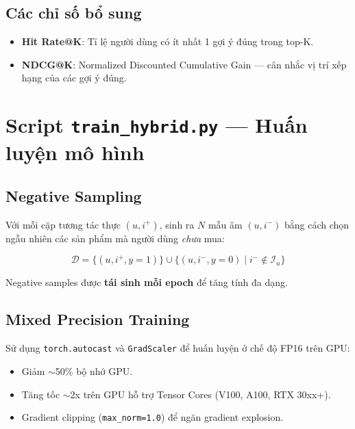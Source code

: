 \documentclass[12pt,a4paper]{article}
\begin{document}
\subsection{Các chỉ số bổ sung}

\begin{itemize}[leftmargin=2em]
    \item \textbf{Hit Rate@K}: Tỉ lệ người dùng có ít nhất 1 gợi ý đúng trong top-K.
    \item \textbf{NDCG@K}: Normalized Discounted Cumulative Gain —
          cân nhắc vị trí xếp hạng của các gợi ý đúng.
\end{itemize}

\section{Script \texttt{train\_hybrid.py} — Huấn luyện mô hình}

\subsection{Negative Sampling}

Với mỗi cặp tương tác thực $(u, i^+)$, sinh ra $N$ mẫu âm $(u, i^-)$
bằng cách chọn ngẫu nhiên các sản phẩm mà người dùng \textit{chưa} mua:

\begin{equation}
    \mathcal{D} = \{(u, i^+, y=1)\} \cup \{(u, i^-, y=0) \mid i^- \notin \mathcal{I}_u\}
\end{equation}

Negative samples được \textbf{tái sinh mỗi epoch} để tăng tính đa dạng.

\subsection{Mixed Precision Training}

Sử dụng \texttt{torch.autocast} và \texttt{GradScaler} để huấn luyện
ở chế độ FP16 trên GPU:

\begin{itemize}[leftmargin=2em]
    \item Giảm $\sim$50\% bộ nhớ GPU.
    \item Tăng tốc $\sim$2x trên GPU hỗ trợ Tensor Cores (V100, A100, RTX 30xx+).
    \item Gradient clipping (\texttt{max\_norm=1.0}) để ngăn gradient explosion.
\end{itemize}
\end{document}
